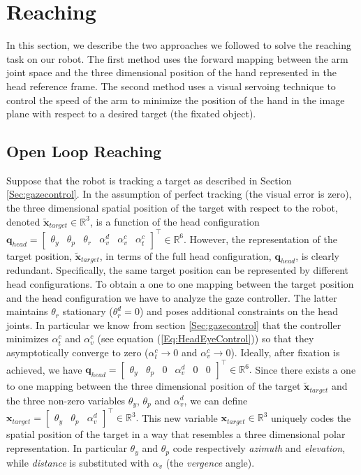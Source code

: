 \section{Reaching}
\label{sec:reaching}

In this section, we describe the two approaches we followed to solve
the reaching task on our robot. The first method 
uses the forward mapping between the arm joint space and the three 
dimensional position of the hand represented in the head reference 
frame. The second method uses a visual servoing technique to control the 
speed of the arm to minimize the position of the hand in the 
image plane with respect to a desired target (the fixated object).

\subsection{Open Loop Reaching}
%
Suppose that the robot is tracking a target as described 
in Section \ref{Sec:gazecontrol}. In the assumption of perfect 
tracking (the visual error is zero), the three dimensional spatial position 
of the target with respect to the robot, denoted $\tilde {\mathbf x}_{target} 
\in \mathbb R^3$, 
is a function of the head configuration $\mathbf q_{head} =
\begin{bmatrix} \theta_y & \theta_p & \theta_r & \alpha_v^d & \alpha_v^c & \alpha_t^c \end{bmatrix}^\top \in \mathbb R^6$.
However, the representation of the target position, 
$\tilde {\mathbf x}_{target}$, in terms of the full head configuration, 
$\mathbf q_{head}$, is clearly redundant.
Specifically, the same target position can be represented by different 
head configurations. To obtain a one to one mapping between the target 
position and the head configuration we have to analyze the 
gaze controller. The latter maintains $\theta_r$ stationary 
($\theta_r^d = 0$) and poses additional constraints on the head joints. 
In particular we know from section \ref{Sec:gazecontrol} that the 
controller minimizes $\alpha_t^c$ and $\alpha^c_v$ (see equation 
(\ref{Eq:HeadEyeControl})) so that they asymptotically
converge to zero ($\alpha_t^c \rightarrow 0$ and 
$\alpha_v^c \rightarrow 0$). Ideally, after 
fixation is achieved, we have $
\mathbf {q}_{head}=
\begin{bmatrix} \theta_y & \theta_p & 0 & \alpha_v^d & 0 & 0 \end{bmatrix}^\top \in \mathbb R^6.
$
%
Since there exists a one to one mapping between the three dimensional 
position of the target 
$\tilde {\mathbf x}_{target}$ and the three non-zero variables 
$\theta_y$, $\theta_p$ and $\alpha_v^d$, we can define $
\mathbf x_{target}=
\begin{bmatrix} \theta_y & \theta_p & \alpha_v^d\end{bmatrix}^\top \in \mathbb R^3.
$
%
This new variable $\mathbf x_{target} \in \mathbb R^3$ uniquely codes the 
spatial position of the target in a way that resembles a three dimensional 
polar representation. In particular $\theta_y$ and $\theta_p$ code 
respectively \emph{azimuth} and \emph{elevation}, while \emph{distance} is 
substituted with $\alpha_v$ (the \emph{vergence} angle). 

